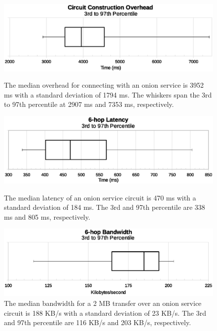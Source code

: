 \documentclass[USenglish,oneside,twocolumn]{article}
\begin{document}
\begin{figure}[h]
	\centering
	\includegraphics[width=\linewidth]{../assets/images/Tor/perf/circuit_construction_overhead.eps}
	\caption{The median overhead for connecting with an onion service is 3952 ms with a standard deviation of 1794 ms. The whiskers span the 3rd to 97th percentile at 2907 ms and 7353 ms, respectively.}
	\label{fig:6HopSetup}
	\vspace{10px}
	
	\includegraphics[width=\linewidth]{../assets/images/Tor/perf/6_hop_latency.eps}
	\caption{The median latency of an onion service circuit is 470 ms with a standard deviation of 184 ms. The 3rd and 97th percentile are 338 ms and 805 ms, respectively.}
	\label{fig:6HopLatency}
	\vspace{10px}
	
	\includegraphics[width=\linewidth]{../assets/images/Tor/perf/6_hop_bw.eps}
	\caption{The median bandwidth for a 2 MB transfer over an onion service circuit is 188 KB/s with a standard deviation of 23 KB/s. The 3rd and 97th percentile are 116 KB/s and 203 KB/s, respectively.}
	\label{fig:6HopBw}
	\vspace{10px}
\end{figure}
\end{document}
